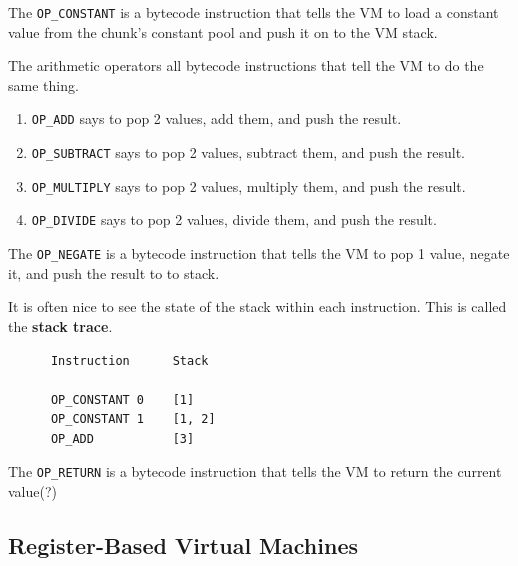   \begin{definition}
    \label{def:op-constant}
    The \texttt{OP\_CONSTANT} is a bytecode instruction that tells the VM to load a constant value from the chunk's constant pool and push it on to the VM stack. 
  \end{definition}

  \begin{definition}[Arithmetic]
    \label{def:arithmetic}
    The arithmetic operators all bytecode instructions that tell the VM to do the same thing. 
    \begin{enumerate}
      \item \texttt{OP\_ADD} says to pop 2 values, add them, and push the result. 
      \item \texttt{OP\_SUBTRACT} says to pop 2 values, subtract them, and push the result. 
      \item \texttt{OP\_MULTIPLY} says to pop 2 values, multiply them, and push the result. 
      \item \texttt{OP\_DIVIDE} says to pop 2 values, divide them, and push the result. 
    \end{enumerate}
  \end{definition} 

  \begin{definition}[Negation]
    \label{def:negation}
    The \texttt{OP\_NEGATE} is a bytecode instruction that tells the VM to pop 1 value, negate it, and push the result to to stack. 
  \end{definition}

  It is often nice to see the state of the stack within each instruction. This is called the \textbf{stack trace}. 

  \begin{example}
    \label{ex:adding-2-numbers}
    \begin{lstlisting}
      Instruction      Stack

      OP_CONSTANT 0    [1]
      OP_CONSTANT 1    [1, 2]
      OP_ADD           [3]
    \end{lstlisting}
  \end{example}

  \begin{definition}
    \label{def:op-return}
    The \texttt{OP\_RETURN} is a bytecode instruction that tells the VM to return the current value(?)
  \end{definition}

\subsection{Register-Based Virtual Machines}

